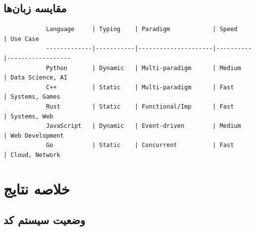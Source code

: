 \documentclass{matinbook}
\begin{document}
    \section{مقایسه زبان‌ها}
    
    \begin{latin}
        \begin{verbatim}
            Language     | Typing    | Paradigm            | Speed    | Use Case
            -------------|-----------|---------------------|----------|------------------
            Python       | Dynamic   | Multi-paradigm      | Medium   | Data Science, AI
            C++          | Static    | Multi-paradigm      | Fast     | Systems, Games
            Rust         | Static    | Functional/Imp      | Fast     | Systems, Web
            JavaScript   | Dynamic   | Event-driven        | Medium   | Web Development
            Go           | Static    | Concurrent          | Fast     | Cloud, Network
        \end{verbatim}
    \end{latin}
    \label{code:comparison}
    
    \chapter{خلاصه نتایج}
    
    \section{وضعیت سیستم کد}
    
\end{document}
